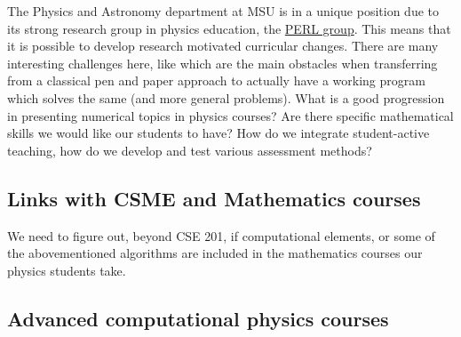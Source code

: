 \documentclass[%
oneside,                 %
final,                   %
10pt]{article}
\begin{document}
The Physics and Astronomy department at MSU is in a unique position due to its strong research group in physics education, the \href{{http://www.pa.msu.edu/research/physics-education-lab}}{PERL group}.
This means that it is possible to
develop research motivated curricular changes.  There are many interesting challenges here, like
which are the main obstacles when transferring from a classical pen and paper approach to actually have a working program which solves the same (and more general problems). What is a good progression in presenting numerical topics in physics courses? Are there specific mathematical skills we would like our students to have? How do we integrate student-active teaching, how do we develop and test various assessment methods?



\subsection{Links with CSME and Mathematics courses}

We need to figure out, beyond CSE 201, if computational elements, or some of the abovementioned algorithms are included in the mathematics courses our physics students take. 


\subsection{Advanced computational physics courses}
\end{document}
